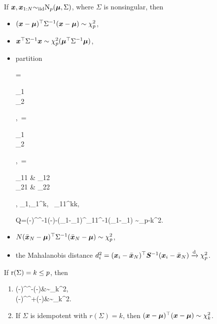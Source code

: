 \documentclass[10pt,a4paper]{book}
\begin{document}
\begin{thmbox}
	\begin{theorem}\label{thm:quad_MVN}
		If ${\boldsymbol x},{\boldsymbol x}_{1:N}{\sim}_{\mathrm{iid}}\mathrm{N}_p({\boldsymbol\mu},\Sigma)$, where $\Sigma$ is nonsingular, then 
		\begin{itemize}
			\item $({\boldsymbol x}-{\boldsymbol\mu})^\top \Sigma^{-1}({\boldsymbol x}-{\boldsymbol\mu})\sim\chi_p^2$,
			\item ${\boldsymbol x}^\top \Sigma^{-1}{\boldsymbol x}\sim\chi_p^2({\boldsymbol\mu}^\top\Sigma^{-1}{\boldsymbol\mu})$,
			\item partition
			\begin{sequation*}
				\x = \begin{bmatrix}
					\x_1 \\ \x_2
				\end{bmatrix},\ \bam=\begin{bmatrix}
					\bam_1 \\ \bam_2
				\end{bmatrix},\ \Sigma=\begin{bmatrix}
					\Sigma_{11} & \Sigma_{12} \\ \Sigma_{21} & \Sigma_{22}
				\end{bmatrix}, \quad \x_1,\bam_1\in\bbR^{k}, \ \Sigma_{11}\in\bbR^{k\times k}, 
			\end{sequation*} 
			\begin{sequation*}
				Q=(\x-\bam)^\TT \Sigma^{-1}(\x-\bam)-(\x_1-\bam_1)^\TT \Sigma_{11}^{-1}(\x_1-\bam_1) \sim \chi_{p-k}^2.
			\end{sequation*}
			\item $N(\bar{{\boldsymbol x}}_N-{\boldsymbol\mu})^{\top}\Sigma^{-1}(\bar{{\boldsymbol x}}_N-{\boldsymbol\mu})\sim\chi_p^2$,
			\item the Mahalanobis distance
			$d_i^2=(\boldsymbol{x}_i-\bar{\boldsymbol{x}}_N)^{\top}{{\boldsymbol S}}^{-1}(\boldsymbol{x}_i-\bar{\boldsymbol{x}}_N) \xrightarrow{\mathrm{d}} \chi_p^2$.
		\end{itemize} 
		If $\mathrm{r}(\Sigma)=k\leq p$, then 
		\begin{enumerate}
			\item 
			\begin{sequation*}
				\begin{aligned}
					(\x-\bam)^\TT \Sigma^{-}(\x-\bam)&\sim\chi_{k}^2,\\
					(\x-\bam)^\TT \Sigma^{+}(\x-\bam)&\sim\chi_{k}^2.
				\end{aligned}
			\end{sequation*}
			\item If $\Sigma$ is idempotent with $r(\Sigma)=k$, then $({\boldsymbol x}-{\boldsymbol\mu})^\top  ({\boldsymbol x}-{\boldsymbol\mu})\sim\chi_k^2$.  

\end{enumerate}
\end{theorem}
\end{thmbox}
\end{document}
